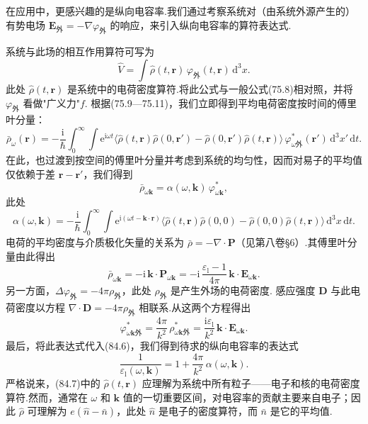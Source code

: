 在应用中，更感兴趣的是纵向电容率.我们通过考察系统对（由系统外源产生的）有势电场 $\bm{E}_{\text{外}}=-\nabla\varphi_{\text{外}}$ 的响应，来引入纵向电容率的算符表达式.

系统与此场的相互作用算符可写为
\begin{equation}
  \hat{V}=\int\hat{\rho}(t,\bm{r})\,\varphi_{\text{外}}(t,\bm{r})\,\mathrm{d}^{3}x.
\end{equation}
此处 $\hat{\rho}(t,\bm{r})$ 是系统中的电荷密度算符.将此公式与一般公式(75.8)相对照，并将 $\varphi_{\text{外}}$ 看做"广义力"$f$. 根据(75.9—75.11)，我们立即得到平均电荷密度按时间的傅里叶分量：
\begin{equation*}
  \bar{\rho}_{\omega}(\bm{r})=-\frac{\mathrm{i}}{\hbar}\int_{0}^{\infty}\!\!\int\mathrm{e}^{\mathrm{i}\omega t}\bigl\langle\hat{\rho}(t,\bm{r})\hat{\rho}(0,\bm{r}')-\hat{\rho}(0,\bm{r}')\hat{\rho}(t,\bm{r})\bigr\rangle\,\varphi^{*}_{\omega\text{外}}(\bm{r}')\,\mathrm{d}^{3}x'\,\mathrm{d}t.
\end{equation*}
在此，也过渡到按空间的傅里叶分量并考虑到系统的均匀性，因而对易子的平均值仅依赖于差 $\bm{r}-\bm{r}'$，我们得到
\begin{equation}
  \bar{\rho}_{\omega\bm{k}}=\alpha(\omega,\bm{k})\,\varphi^{*}_{\omega\bm{k}},
\end{equation}
此处
\begin{equation}
  \alpha(\omega,\bm{k})=-\frac{\mathrm{i}}{\hbar}\int_{0}^{\infty}\!\!\int\mathrm{e}^{\mathrm{i}(\omega t-\bm{k}\cdot\bm{r})}\bigl\langle\hat{\rho}(t,\bm{r})\hat{\rho}(0,0)-\hat{\rho}(0,0)\hat{\rho}(t,\bm{r})\bigr\rangle\,\mathrm{d}^{3}x\,\mathrm{d}t.
\end{equation}
电荷的平均密度与介质极化矢量的关系为 $\bar{\rho}=-\nabla\cdot\bm{P}$（见第八卷§6）.其傅里叶分量由此得出
\begin{equation*}
  \bar{\rho}_{\omega\bm{k}}=-\mathrm{i}\,\bm{k}\cdot\bm{P}_{\omega\bm{k}}=-\mathrm{i}\,\frac{\varepsilon_{\mathrm{l}}-1}{4\pi}\,\bm{k}\cdot\bm{E}_{\omega\bm{k}}.
\end{equation*}
另一方面，$\Delta\varphi_{\text{外}}=-4\pi\rho_{\text{外}}$，此处 $\rho_{\text{外}}$ 是产生外场的电荷密度. 感应强度 $\bm{D}$ 与此电
荷密度以方程 $\nabla\cdot\bm{D}=-4\pi\rho_{\text{外}}$ 相联系.从这两个方程得出
\begin{equation*}
  \varphi^{*}_{\omega\bm{k}\text{外}}=\frac{4\pi}{k^{2}}\,\rho^{*}_{\omega\bm{k}\text{外}}=\frac{\mathrm{i}\varepsilon_{\mathrm{l}}}{k^{2}}\,\bm{k}\cdot\bm{E}_{\omega\bm{k}}.
\end{equation*}
最后，将此表达式代入(84.6)，我们得到待求的纵向电容率的表达式
\begin{equation}
  \frac{1}{\varepsilon_{\mathrm{l}}(\omega,\bm{k})}=1+\frac{4\pi}{k^{2}}\,\alpha(\omega,\bm{k}).
\end{equation}
严格说来，(84.7)中的 $\hat{\rho}(t,\bm{r})$ 应理解为系统中所有粒子——电子和核的电荷密度算符.然而，通常在 $\omega$ 和 $\bm{k}$ 值的一切重要区间，对电容率的贡献主要来自电子；因此 $\hat{\rho}$ 可理解为 $e(\hat{n}-\bar{n})$，此处 $\hat{n}$ 是电子的密度算符，而 $\bar{n}$ 是它的平均值.


